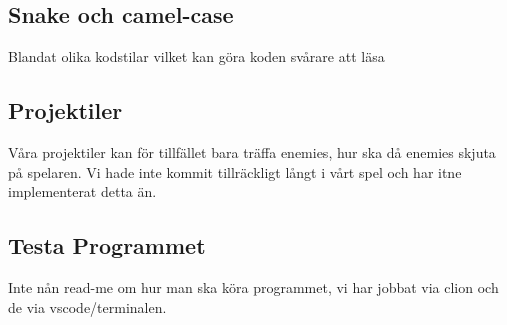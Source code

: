 \documentclass{TDP005mall}
\begin{document}
\subsection{Snake och camel-case}
Blandat olika kodstilar vilket kan göra koden svårare att läsa

\subsection{Projektiler}
Våra projektiler kan för tillfället bara träffa enemies, hur ska då enemies skjuta på spelaren. Vi hade inte kommit tillräckligt långt i vårt spel och har itne implementerat detta än.

\subsection{Testa Programmet}
Inte nån read-me om hur man ska köra programmet, vi har jobbat via clion och de via vscode/terminalen.
\end{document}
